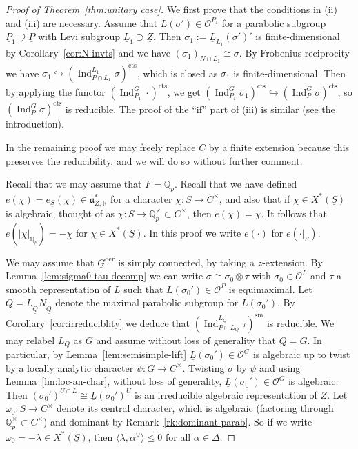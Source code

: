 \documentclass[a4paper]{amsart}
\numberwithin{equation}{section}
\theoremstyle{remark}
\theoremstyle{definition}
\DeclareMathOperator{\Ind}{Ind}
\newcommand{\Q}{\mathbb{Q}}
\newcommand{\R}{\mathbb{R}}
\newcommand{\sm}{\mathrm{sm}}
\newcommand{\alggrp}[1]{\underline{#1}}
\newcommand{\der}{\mathrm{der}}
\newcommand{\cts}{\mathrm{cts}}
\newcommand{\ang}[1]{\langle #1\rangle}
\renewcommand{\simeq}{\cong}
\begin{document}
\begin{proof}[Proof of Theorem~\ref{thm:unitary case}]
  We first prove that the conditions in (ii) and (iii) are necessary.
  Assume that $\underline{L}(\sigma')\in \mathcal{O}^{P_{1}}$ for a parabolic subgroup $\alggrp{P}_{1}\supsetneq \alggrp{P}$ with Levi subgroup $\alggrp{L}_{1} \supset \alggrp Z$.
  Then $\sigma_{1} := \underline{L}_{L_{1}}(\sigma')'$ is finite-dimensional by Corollary~\ref{cor:N-invts} and we have $(\sigma_{1})_{N\cap L_{1}}\simeq \sigma$.
  By Frobenius reciprocity we have $\sigma_{1}\hookrightarrow (\Ind_{P \cap L_{1}}^{L_{1}}\sigma)^{\cts}$, which is closed as $\sigma_{1}$ is finite-dimensional.
  Then by applying the functor $(\Ind_{P_{1}}^{G} \cdot )^{\cts}$, we get $(\Ind_{P_{1}}^{G}\sigma_{1})^{\cts}\hookrightarrow (\Ind_{P}^{G}\sigma)^{\cts}$, so $(\Ind_{P}^{G}\sigma)^{\cts}$ is reducible.
  The proof of the ``if'' part of (iii) is similar (see the introduction).

  In the remaining proof we may freely replace $C$ by a finite extension because this preserves the reducibility, and we will do so without further comment.

  Recall that we may assume that $F = \Q_p$.
  Recall that we have defined $e(\chi) = e_{\alggrp{S}}(\chi)\in \mathfrak{a}_{Z,\R}^{*}$ for a character $\chi\colon S\to C^{\times}$,
  and also that if $\chi\in X^{*}(\alggrp S)$ is algebraic, thought of as $\chi : S \to \Q_p^\times \subset C^\times$, then $e(\chi) = \chi$.
  It follows that $e(\lvert \chi\rvert_{\Q_p}) = -\chi$ for $\chi \in X^{*}(\alggrp S)$.
  In this proof we write $e(\cdot)$ for $e(\cdot|_{S})$.

  We may assume that $\alggrp{G}^{\der}$ is simply connected, by taking a $z$-extension.
  By Lemma~\ref{lem:sigma0-tau-decomp} we can write $\sigma \cong \sigma_0 \otimes \tau$ with $\sigma_0 \in \mathcal{O}^{L}$ and $\tau$ a smooth representation of $L$ such that $\alggrp{L}(\sigma_0') \in \mathcal{O}^{P}$ is equimaximal. 
  Let $\alggrp{Q} = \alggrp{L}_{\alggrp Q}\alggrp{N}_{\alggrp Q}$ denote the maximal parabolic subgroup for $\underline{L}(\sigma_0')$.
  By Corollary~\ref{cor:irreduciblity} we deduce that $(\Ind_{P \cap L_Q}^{L_Q} \tau)^\sm$ is reducible.
  We may relabel $L_Q$ as $G$ and assume without loss of generality that $Q = G$.
  In particular, by Lemma~\ref{lem:semisimple-lift} $\alggrp{L}(\sigma_0') \in \mathcal{O}^{G}$ is algebraic up to twist by a locally analytic character $\psi \colon G \to C^{\times}$.
  Twisting $\sigma$ by $\psi$ and using Lemma~\ref{lm:loc-an-char}, without loss of generality, $\alggrp{L}(\sigma_0') \in \mathcal{O}^{G}$ is algebraic.
  Then $(\sigma_0')^{U \cap L} \cong \alggrp{L}(\sigma_0')^U$ is an irreducible algebraic representation of $Z$.
  Let $\omega_0 \colon S \to C^{\times}$ denote its central character, which is algebraic (factoring through $\Q_p^\times \subset C^\times$) and dominant by Remark~\ref{rk:dominant-parab}.
  So if we write $\omega_0 = -\lambda \in X^*(\alggrp{S})$, then $\ang{\lambda,\alpha^{\vee}} \le 0$ for all $\alpha \in \Delta$.


\end{proof}
\end{document}
